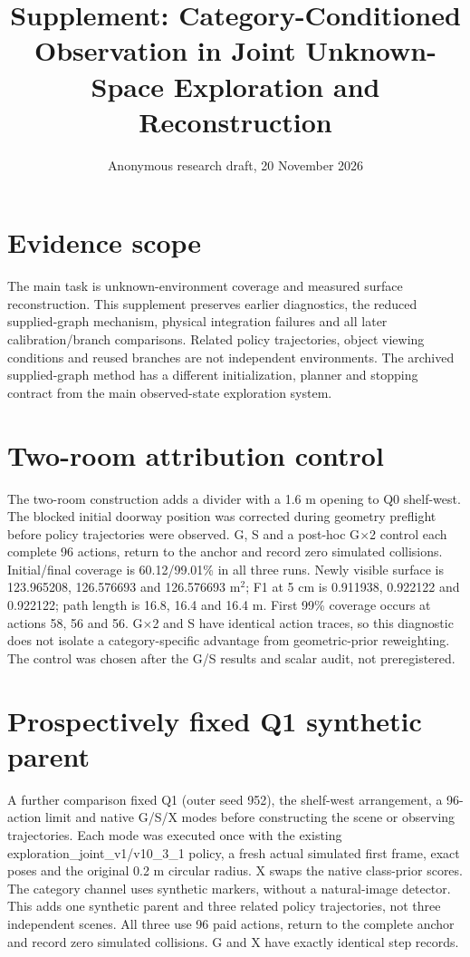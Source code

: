 \documentclass[11pt,a4paper]{article}
\begin{document}
\title{Supplement: Category-Conditioned Observation in Joint Unknown-Space Exploration and Reconstruction}
\author{}\date{Anonymous research draft, 20 November 2026}\maketitle
\section*{Evidence scope}
The main task is unknown-environment coverage and measured surface reconstruction. This supplement preserves earlier diagnostics, the reduced supplied-graph mechanism, physical integration failures and all later calibration/branch comparisons. Related policy trajectories, object viewing conditions and reused branches are not independent environments. The archived supplied-graph method has a different initialization, planner and stopping contract from the main observed-state exploration system.
\renewcommand{\thetable}{S\arabic{table}}



\section{Two-room attribution control}
The two-room construction adds a divider with a 1.6 m opening to Q0 shelf-west. The blocked initial doorway position was corrected during geometry preflight before policy trajectories were observed. G, S and a post-hoc G$\times$2 control each complete 96 actions, return to the anchor and record zero simulated collisions. Initial/final coverage is 60.12/99.01\% in all three runs. Newly visible surface is 123.965208, 126.576693 and 126.576693 m$^2$; F1 at 5 cm is 0.911938, 0.922122 and 0.922122; path length is 16.8, 16.4 and 16.4 m. First 99\% coverage occurs at actions 58, 56 and 56. G$\times$2 and S have identical action traces, so this diagnostic does not isolate a category-specific advantage from geometric-prior reweighting. The control was chosen after the G/S results and scalar audit, not preregistered.
\section{Prospectively fixed Q1 synthetic parent}

A further comparison fixed Q1 (outer seed 952), the shelf-west arrangement, a 96-action limit and native G/S/X modes before constructing the scene or observing trajectories. Each mode was executed once with the existing exploration\_joint\_v1/v10\_3\_1 policy, a fresh actual simulated first frame, exact poses and the original 0.2 m circular radius. X swaps the native class-prior scores. The category channel uses synthetic markers, without a natural-image detector. This adds one synthetic parent and three related policy trajectories, not three independent scenes. All three use 96 paid actions, return to the complete anchor and record zero simulated collisions. G and X have exactly identical step records.
\end{document}
